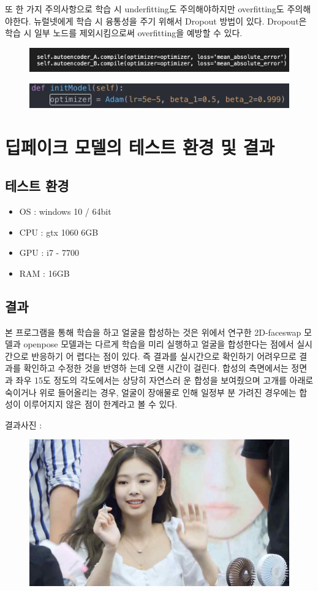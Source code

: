 \documentclass{oblivoir}
\newcommand{\spec}{
    \begin{itemize}
        \item OS : windows 10 / 64bit
        \item CPU : gtx 1060 6GB
        \item GPU : i7 - 7700
        \item RAM : 16GB
    \end{itemize}
    }
\begin{document}
또 한 가지 주의사항으로 학습 시 underfitting도 주의해야하지만 overfitting도 주의해야한다. 뉴럴넷에게 학습 시 융통성을 주기 위해서 Dropout 방법이 있다. Dropout은 학습 시 일부 노드를 제외시킴으로써 overfitting을 예방할 수 있다.

\begin{figure}[h!]
\centering
\includegraphics{pic/chp4/img831}
\end{figure}

\begin{figure}[h!]
\centering
\includegraphics{pic/chp4/img838}
\end{figure}

\section{ 딥페이크 모델의 테스트 환경 및 결과}

\subsection{테스트 환경 }
\spec
\subsection{결과}

본 프로그램을 통해 학습을 하고 얼굴을 합성하는 것은 위에서 연구한 2D-faceswap 모델과  openpose 모델과는 다르게 학습을 미리 실행하고 얼굴을 합성한다는 점에서 실시간으로 반응하기 어 렵다는 점이 있다. 즉 결과를 실시간으로 확인하기 어려우므로 결과를 확인하고 수정한 것을 반영하 는데 오랜 시간이 걸린다. 합성의 측면에서는 정면과 좌우 15도 정도의 각도에서는 상당히 자연스러 운 합성을 보여줬으며 고개를 아래로 숙이거나 위로 들어올리는 경우, 얼굴이 장애물로 인해 일정부 분 가려진 경우에는 합성이 이루어지지 않은 점이 한계라고 볼 수 있다.

결과사진 :

\begin{figure}[h!]
\centering
\includegraphics{pic/chp4/img845}
\end{figure}
\end{document}
